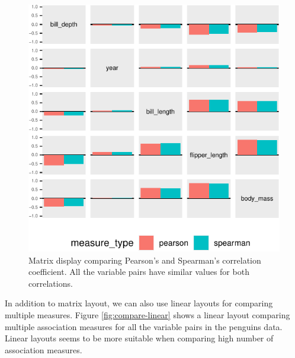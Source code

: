 \begin{Schunk}
\begin{figure}

{\centering \includegraphics{rj_paper_files/figure-latex/compare-matrix-1} 

}

\caption[Matrix display comparing Pearson's and Spearman's correlation coefficient]{Matrix display comparing Pearson's and Spearman's correlation coefficient. All the variable pairs have similar values for both correlations.}\label{fig:compare-matrix}
\end{figure}
\end{Schunk}

In addition to matrix layout, we can also use linear layouts for
comparing multiple measures. Figure \ref{fig:compare-linear} shows a
linear layout comparing multiple association measures for all the
variable pairs in the penguins data. Linear layouts seems to be more
suitable when comparing high number of association measures.

